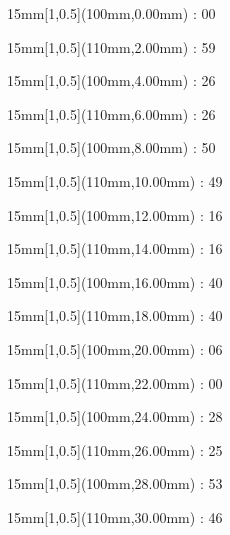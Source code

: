 \documentclass[a5paper]{memoir}
\begin{document}
\begin{textblock*}{15mm}[1,0.5](100mm,0.00mm) : 00\gridstrut\end{textblock*}
\begin{textblock*}{15mm}[1,0.5](110mm,2.00mm) : 59\gridstrut\end{textblock*}
\begin{textblock*}{15mm}[1,0.5](100mm,4.00mm) : 26\gridstrut\end{textblock*}
\begin{textblock*}{15mm}[1,0.5](110mm,6.00mm) : 26\gridstrut\end{textblock*}
\begin{textblock*}{15mm}[1,0.5](100mm,8.00mm) : 50\gridstrut\end{textblock*}
\begin{textblock*}{15mm}[1,0.5](110mm,10.00mm) : 49\gridstrut\end{textblock*}
\begin{textblock*}{15mm}[1,0.5](100mm,12.00mm) : 16\gridstrut\end{textblock*}
\begin{textblock*}{15mm}[1,0.5](110mm,14.00mm) : 16\gridstrut\end{textblock*}
\begin{textblock*}{15mm}[1,0.5](100mm,16.00mm) : 40\gridstrut\end{textblock*}
\begin{textblock*}{15mm}[1,0.5](110mm,18.00mm) : 40\gridstrut\end{textblock*}
\begin{textblock*}{15mm}[1,0.5](100mm,20.00mm) : 06\gridstrut\end{textblock*}
\begin{textblock*}{15mm}[1,0.5](110mm,22.00mm) : 00\gridstrut\end{textblock*}
\begin{textblock*}{15mm}[1,0.5](100mm,24.00mm) : 28\gridstrut\end{textblock*}
\begin{textblock*}{15mm}[1,0.5](110mm,26.00mm) : 25\gridstrut\end{textblock*}
\begin{textblock*}{15mm}[1,0.5](100mm,28.00mm) : 53\gridstrut\end{textblock*}
\begin{textblock*}{15mm}[1,0.5](110mm,30.00mm) : 46\gridstrut\end{textblock*}
\end{document}
